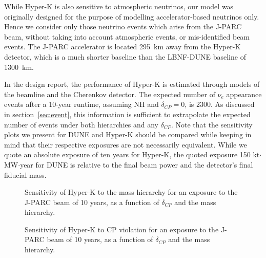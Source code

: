 While Hyper-K is also sensitive to atmospheric neutrinos, our
model was originally designed for the purpose of modelling accelerator-based
neutrinos only. Hence we consider only those neutrino events which arise from the
J-PARC beam, without taking into account atmospheric events, or
mis-identified beam events. The J-PARC accelerator is located \SI{295}{\km}
away from the Hyper-K detector, which is a much shorter baseline than the
LBNF-DUNE baseline of \SI{1300}{\km}.

In the design report, the performance of Hyper-K is estimated through models of
the beamline and the Cherenkov detector. The expected number of $\nu_e$ appearance
events after a 10-year runtime, assuming NH and $\delta_{CP}=0$, is 2300.
As discussed in section~\ref{sec:event}, this information is sufficient to extrapolate the
expected number of events under both hierarchies and any $\delta_{CP}$.
Note that the sensitivity plots we present for DUNE and Hyper-K should be
compared while keeping in mind that their respective exposures are not
necessarily equivalent. While we quote an absolute exposure of ten years for
Hyper-K, the quoted exposure 150 kt$\cdot$MW$\cdot$year for DUNE is relative to
the final beam power and the detector's final fiducial mass.

\begin{figure}
	\centering
\caption{Sensitivity of Hyper-K to the mass hierarchy for an exposure to the J-PARC
	beam of 10 years, as a function of $\delta_{CP}$ and the mass hierarchy.}
\label{fig:hk_sens_mh}
\end{figure}

\begin{figure}
	\centering
\caption{Sensitivity of Hyper-K to CP violation for an exposure to the J-PARC
	beam of 10 years, as a function of $\delta_{CP}$ and the mass hierarchy.}
\label{fig:hk_sens_cp}
\end{figure}

